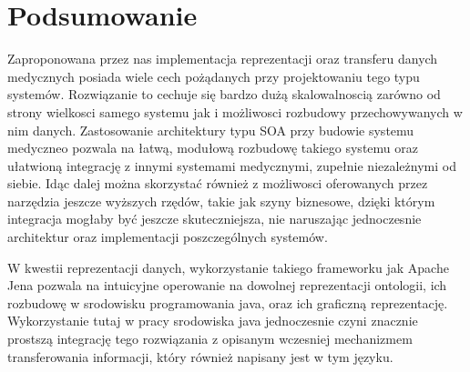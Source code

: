 \section{Podsumowanie}
\label{cha:podsumowanie}

Zaproponowana przez nas implementacja reprezentacji oraz transferu danych medycznych posiada wiele cech pożądanych przy projektowaniu tego typu systemów. Rozwiązanie to cechuje się bardzo dużą skalowalnoscią zarówno od strony wielkosci samego systemu jak i możliwosci rozbudowy przechowywanych w nim danych. Zastosowanie architektury typu SOA przy budowie systemu medyczneo pozwala na łatwą, modułową rozbudowę takiego systemu oraz ułatwioną integrację z innymi systemami medycznymi, zupełnie niezależnymi od siebie. Idąc dalej można skorzystać również z możliwosci oferowanych przez narzędzia jeszcze wyższych rzędów, takie jak szyny biznesowe, dzięki którym integracja mogłaby być jeszcze skuteczniejsza, nie naruszając jednoczesnie architektur oraz implementacji poszczególnych systemów.

W kwestii reprezentacji danych, wykorzystanie takiego frameworku jak Apache Jena pozwala na intuicyjne operowanie na dowolnej reprezentacji ontologii, ich rozbudowę w srodowisku programowania java, oraz ich graficzną reprezentację. Wykorzystanie tutaj w pracy srodowiska java jednoczesnie czyni znacznie prostszą integrację tego rozwiązania z opisanym wczesniej mechanizmem transferowania informacji, który również napisany jest w tym języku.